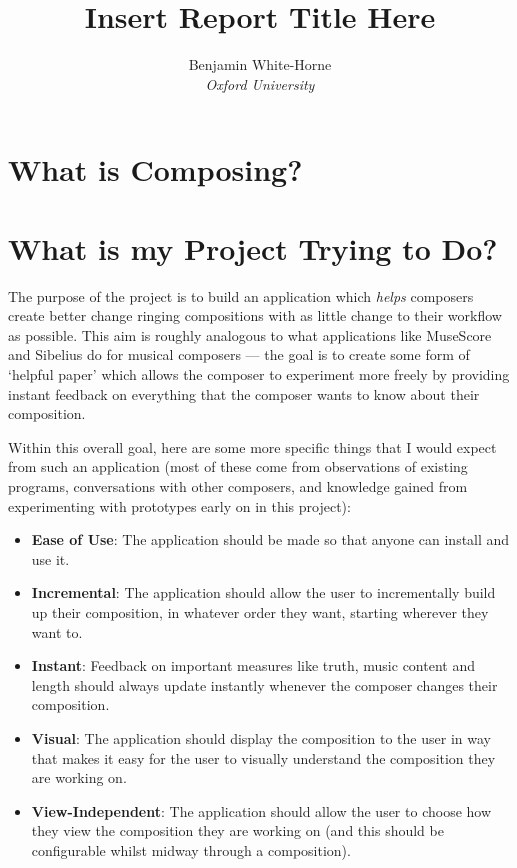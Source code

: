 \documentclass[12pt]{article}
\title{Insert Report Title Here}
\author{Benjamin White-Horne \\ \emph{Oxford University}}
\begin{document}
\maketitle
\pagebreak
\tableofcontents
\pagebreak

\section{What is Composing?}

\section{What is my Project Trying to Do?}

The purpose of the project is to build an application which \emph{helps} composers create better
change ringing compositions with as little change to their workflow as possible.  This aim is
roughly analogous to what applications like MuseScore and Sibelius do for musical composers --- the
goal is to create some form of `helpful paper' which allows the composer to experiment more freely
by providing instant feedback on everything that the composer wants to know about their composition.

Within this overall goal, here are some more specific things that I would expect from such an
application (most of these come from observations of existing programs, conversations with other
composers, and knowledge gained from experimenting with prototypes early on in this project):

\begin{itemize}
    \item \textbf{Ease of Use}: The application should be made so that anyone can install and use
        it.
    \item \textbf{Incremental}: The application should allow the user to incrementally build up
        their composition, in whatever order they want, starting wherever they want to.
    \item \textbf{Instant}: Feedback on important measures like truth, music content and length
        should always update instantly whenever the composer changes their composition.
    \item \textbf{Visual}: The application should display the composition to the user in way that
        makes it easy for the user to visually understand the composition they are working on.
    \item \textbf{View-Independent}: The application should allow the user to choose how they view
        the composition they are working on (and this should be configurable whilst midway through a
        composition).
\end{itemize}
\end{document}
